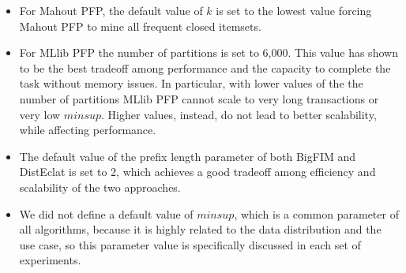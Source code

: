 \documentclass[preprint,review,12pt]{elsarticle}
\begin{document}
\begin{itemize}
\item
For Mahout PFP, the default value of $k$ is set to the lowest value forcing
Mahout PFP to mine all frequent closed itemsets.
\item
For MLlib PFP the number of partitions is set to 6,000.
This value has shown to be the best tradeoff among performance
and the capacity to complete the task without memory issues.
In particular, with lower values of the the number of partitions MLlib PFP
cannot scale to very long transactions or very low $minsup$.
Higher values, instead, do not lead to better scalability, while affecting performance.
\item
The default value
of the prefix length parameter of both BigFIM and DistEclat is set to 2, which achieves a good tradeoff 
among efficiency and scalability of the two approaches.


\item We did not define a default value of $minsup$,
which is a common parameter of all algorithms, 
because it is highly related to the data distribution and the use case, 
so this parameter value is specifically discussed in each set of experiments.
\end{itemize}


\end{document}
